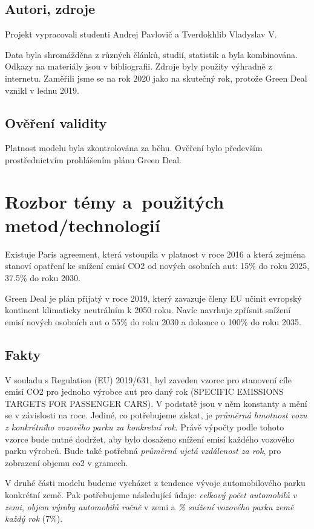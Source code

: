 \documentclass[a4paper, 11pt]{article}
\begin{document}
	\subsection{Autori, zdroje}
	
	Projekt vypracovali studenti Andrej Pavlovič a Tverdokhlib Vladyslav V.
    
    Data byla shromážděna z různých článků, studií, statistik a byla kombinována. Odkazy na materiály jsou v bibliografii. Zdroje byly použity výhradně z internetu. Zaměřili jsme se na rok 2020 jako na skutečný rok, protože Green Deal vznikl v lednu 2019.
	\subsection{Ověření validity}
	Platnost modelu byla zkontrolována za běhu. Ověření bylo především prostřednictvím prohlášením plánu Green Deal.

	\section{Rozbor témy a~použitých metod/technologií}
    Existuje Paris agreement, která vstoupila v platnost v roce 2016 a která zejména stanoví opatření ke snížení emisí CO2 od nových osobních aut: 15\% do roku 2025, 37.5\% do roku 2030.
    
    Green Deal je plán přijatý v roce 2019, který zavazuje členy EU učinit evropský kontinent klimaticky neutrálním k 2050 roku. Navíc navrhuje zpřísnit snížení emisí nových osobních aut o 55\% do roku 2030 a dokonce o 100\% do roku 2035.
	\subsection{Fakty}
    V souladu s Regulation (EU) 2019/631, byl zaveden vzorec pro stanovení cíle emisí CO2 pro jednoho výrobce aut pro daný rok (SPECIFIC EMISSIONS TARGETS FOR PASSENGER CARS).
    V podstatě jsou v něm konstanty a mění se v závislosti na roce. Jediné, co potřebujeme získat, je \textit{průměrná hmotnost vozu z konkrétního vozového parku za konkretní rok}. Právě výpočty podle tohoto vzorce bude nutné dodržet, aby bylo dosaženo snížení emisí každého vozového parku výrobců. Bude také potřebná \textit{průměrná ujetá vzdálenost za rok}, pro zobrazení objemu co2 v gramech.

    V druhé části modelu budeme vycházet z tendence vývoje automobilového parku konkrétní země. Pak potřebujeme následující údaje: \textit{celkový počet automobilů v zemi}, \textit{objem výroby automobilů ročně} v zemi a \textit{\% snížení vozového parku země každý rok} (7\%).
\end{document}
